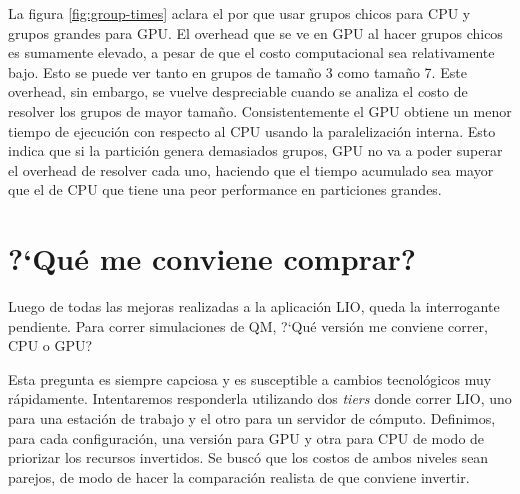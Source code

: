 La figura \ref{fig:group-times} aclara el por que usar grupos chicos para CPU y grupos grandes
para GPU. El overhead que se ve en GPU al hacer grupos chicos es sumamente elevado, a pesar de que
el costo computacional sea relativamente bajo. Esto se puede ver tanto en grupos de tama\~no
3 como tama\~no 7. Este overhead, sin embargo, se vuelve despreciable cuando se analiza el costo
de resolver los grupos de mayor tama\~no. Consistentemente el GPU obtiene un menor tiempo de ejecuci\'on
con respecto al CPU usando la paralelizaci\'on interna. Esto indica que si la partici\'on genera demasiados
grupos, GPU no va a poder superar el overhead de resolver cada uno, haciendo que el tiempo acumulado sea
mayor que el de CPU que tiene una peor performance en particiones grandes.

\section{?`Qu\'e me conviene comprar?}
Luego de todas las mejoras realizadas a la aplicaci\'on LIO, queda la interrogante pendiente. Para
correr simulaciones de QM, ?`Qu\'e versi\'on me conviene correr, CPU o GPU?

Esta pregunta es siempre capciosa y es susceptible a cambios tecnol\'ogicos muy r\'apidamente. Intentaremos
responderla utilizando dos \textit{tiers} donde correr LIO, uno para una estaci\'on de trabajo
y el otro para un servidor de c\'omputo. Definimos, para cada configuraci\'on, una versi\'on para GPU y otra
para CPU de modo de priorizar los recursos invertidos. Se busc\'o que los costos de ambos niveles
sean parejos, de modo de hacer la comparaci\'on realista de que conviene invertir.

